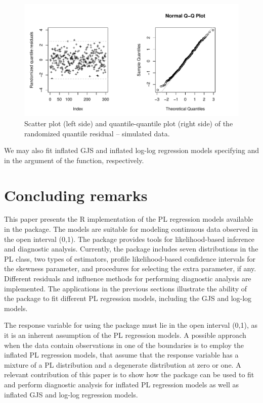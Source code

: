 \begin{figure}[t!]
\centering
\includegraphics[scale=0.8]{figures/Fig8}
\caption{\label{fig:Fig8} Scatter plot (left side) and quantile-quantile plot (right side) of the randomized quantile residual -- simulated data.}
\end{figure}

We may also fit inflated GJS and inflated log-log regression models specifying  and  in the  argument of the  function, respectively. 


\section{Concluding remarks} \label{sec:summary}

This paper presents the R implementation of the PL regression models available in the  package. The models are suitable for modeling continuous data observed in the open interval (0,1). The package provides tools for likelihood-based inference and diagnostic analysis. Currently, the package includes seven distributions in the PL class, two types of estimators, profile likelihood-based confidence intervals for the skewness parameter, and procedures for selecting the extra parameter, if any. Different residuals and influence methods for performing diagnostic analysis are implemented. The applications in the previous sections illustrate the ability of the package to fit different PL regression models, including the GJS and log-log models.

The response variable for using the  package must lie in the open interval (0,1), as it is an inherent assumption of the PL regression models. A possible approach when the data contain observations in one of the boundaries is to employ the inflated PL regression models, that assume that the response variable has a mixture of a PL distribution and a degenerate distribution at zero or one. A relevant contribution of this paper is to show how the  package can be used to fit and perform diagnostic analysis for inflated PL regression models as well as inflated GJS and log-log regression models.

